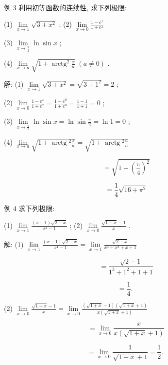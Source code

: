 \documentclass[lang=cn,newtx,10pt,scheme=chinese]{elegantbook}
\begin{document}
例 3 利用初等函数的连续性, 求下列极限:

(1) \(\mathop{\lim }\limits_{{x \rightarrow 1}}\sqrt{3 + {x}^{2}}\) ; (2) \(\mathop{\lim }\limits_{{x \rightarrow 0}}\frac{1 - {e}^{x}}{1 + {e}^{x}}\)

(3) \(\mathop{\lim }\limits_{{x \rightarrow \frac{\pi }{2}}}\ln \sin x\) ;

(4) \(\mathop{\lim }\limits_{{x \rightarrow a}}\sqrt{1 + {\operatorname{arctg}}^{2}\frac{x}{a}}\;\left( {a \neq 0}\right)\) .

解: (1) \(\mathop{\lim }\limits_{{x \rightarrow 1}}\sqrt{3 + {x}^{2}} = \sqrt{3 + {1}^{2}} = 2\) ;

(2) \(\mathop{\lim }\limits_{{x \rightarrow 0}}\frac{1 - {e}^{x}}{1 + {e}^{x}} = \frac{1 - {e}^{0}}{1 + {e}^{0}} = \frac{1 - 1}{1 + 1} = 0\) ;

(3) \(\mathop{\lim }\limits_{{x \rightarrow \frac{\pi }{2}}}\ln \sin x = \ln \sin \frac{\pi }{2} = \ln 1 = 0\) ;

(4) \(\mathop{\lim }\limits_{{x \rightarrow a}}\sqrt{1 + \operatorname{arctg}{}^{2}\frac{x}{a}} = \sqrt{1 + \operatorname{arctg}{}^{2}\frac{a}{a}}\)

\[
= \sqrt{1 + {\left( \frac{\pi }{4}\right) }^{2}}
\]

\[
= \frac{1}{4}\sqrt{{16} + {\pi }^{2}}
\]

例 4 求下列极限:

(1) \(\mathop{\lim }\limits_{{x \rightarrow 1}}\frac{\left( {x - 1}\right) \sqrt{2 - x}}{{x}^{4} - 1}\) ; (2) \(\mathop{\lim }\limits_{{x \rightarrow 0}}\frac{\sqrt{1 + x} - 1}{x}\) .

解: (1) \(\mathop{\lim }\limits_{{x \rightarrow 1}}\frac{\left( {x - 1}\right) \sqrt{2 - x}}{{x}^{4} - 1} = \mathop{\lim }\limits_{{x \rightarrow 1}}\frac{\sqrt{2 - x}}{{x}^{3} + {x}^{2} + x + 1}\)

\[
= \frac{\sqrt{2 - 1}}{{1}^{3} + {1}^{2} + 1 + 1}
\]

\[
= \frac{1}{4}\text{. }
\]

(2) \(\mathop{\lim }\limits_{{x \rightarrow 0}}\frac{\sqrt{1 + x} - 1}{x} = \mathop{\lim }\limits_{{x \rightarrow 0}}\frac{\left( {\sqrt{1 + x} - 1}\right) \left( {\sqrt{1 + x} + 1}\right) }{x\left( {\sqrt{1 + x} + 1}\right) }\)

\[
= \mathop{\lim }\limits_{{x \rightarrow 0}}\frac{x}{x\left( {\sqrt{1 + x} + 1}\right) }
\]

\[
= \mathop{\lim }\limits_{{x \rightarrow 0}}\frac{1}{\sqrt{1 + x} + 1} = \frac{1}{2}\text{. }
\]
\end{document}
